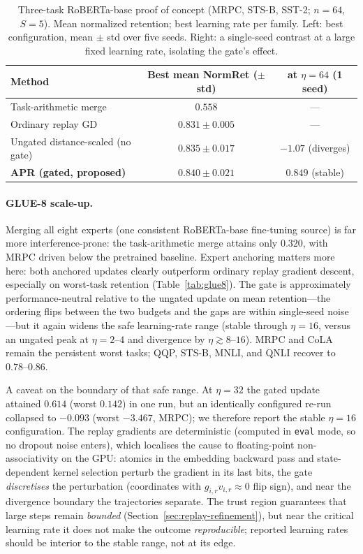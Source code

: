 \documentclass[11pt]{article}
\begin{document}
\begin{table}[t]
\centering
\caption{Three-task RoBERTa-base proof of concept (MRPC, STS-B, SST-2; $n=64$, $S=5$). Mean normalized retention; best learning rate per family. Left: best configuration, mean $\pm$ std over five seeds. Right: a single-seed contrast at a large fixed learning rate, isolating the gate's effect.}
\label{tab:poc3}
\begin{tabular}{lcc}
\toprule
Method & Best mean NormRet ($\pm$ std) & at $\eta=64$ (1 seed) \\
\midrule
Task-arithmetic merge & $0.558$ & --- \\
Ordinary replay GD & $0.831\pm0.005$ & --- \\
Ungated distance-scaled (no gate) & $0.835\pm0.017$ & $-1.07$ (diverges) \\
\textbf{APR (gated, proposed)} & $\mathbf{0.840\pm0.021}$ & $\mathbf{0.849}$ (stable) \\
\bottomrule
\end{tabular}
\end{table}

\paragraph{GLUE-8 scale-up.}
Merging all eight experts (one consistent RoBERTa-base fine-tuning source) is far more interference-prone: the task-arithmetic merge attains only $0.320$, with MRPC driven below the pretrained baseline. Expert anchoring matters more here: both anchored updates clearly outperform ordinary replay gradient descent, especially on worst-task retention (Table~\ref{tab:glue8}). The gate is approximately performance-neutral relative to the ungated update on mean retention---the ordering flips between the two budgets and the gaps are within single-seed noise---but it again widens the safe learning-rate range (stable through $\eta=16$, versus an ungated peak at $\eta=2\text{--}4$ and divergence by $\eta\gtrsim 8\text{--}16$). MRPC and CoLA remain the persistent worst tasks; QQP, STS-B, MNLI, and QNLI recover to $0.78\text{--}0.86$.

A caveat on the boundary of that safe range. At $\eta=32$ the gated update attained $0.614$ (worst $0.142$) in one run, but an identically configured re-run collapsed to $-0.093$ (worst $-3.467$, MRPC); we therefore report the stable $\eta=16$ configuration. The replay gradients are deterministic (computed in \texttt{eval} mode, so no dropout noise enters), which localises the cause to floating-point non-associativity on the GPU: atomics in the embedding backward pass and state-dependent kernel selection perturb the gradient in its last bits, the gate \emph{discretises} the perturbation (coordinates with $g_{i,r}v_{i,r}\approx 0$ flip sign), and near the divergence boundary the trajectories separate. The trust region guarantees that large steps remain \emph{bounded} (Section~\ref{sec:replay-refinement}), but near the critical learning rate it does not make the outcome \emph{reproducible}; reported learning rates should be interior to the stable range, not at its edge.
\end{document}
